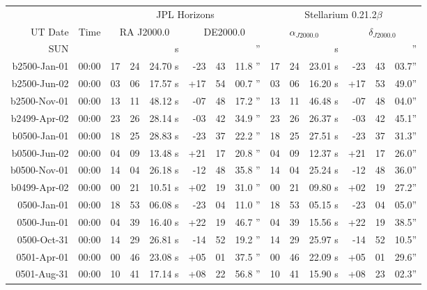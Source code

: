 \begin{longtable}{r@{\,}r|r@{h}r@{m}r<{s}|r@{°}r@{'}r<{''}||r@{h}r@{m}r<{s}|r@{°}r@{'}r<{''}}

\multicolumn{2}{c}{}&\multicolumn{6}{c||}{JPL Horizons} & \multicolumn{6}{c}{Stellarium 0.21.2$\beta$}\\ 
UT Date   & Time   & \multicolumn{3}{c}{RA J2000.0} & \multicolumn{3}{c||}{DE2000.0} & \multicolumn{3}{c}{$\alpha_{J2000.0}$} & \multicolumn{3}{c}{$\delta_{J2000.0}$} \\
\endhead
  
SUN\\
b2500-Jan-01 & 00:00  &   17 & 24 & 24.70 & -23 & 43 & 11.8 & 17&24&23.01 & -23&43&03.7\\ %
b2500-Jun-02 & 00:00  &   03 & 06 & 17.57 & +17 & 54 & 00.7 & 03&06&16.20 & +17&53&49.0\\ %
b2500-Nov-01 & 00:00  &   13 & 11 & 48.12 & -07 & 48 & 17.2 & 13&11&46.48 & -07&48&04.0\\ %
b2499-Apr-02 & 00:00  &   23 & 26 & 28.14 & -03 & 42 & 34.9 & 23&26&26.37 & -03&42&45.1\\ %
b0500-Jan-01 & 00:00  &   18 & 25 & 28.83 & -23 & 37 & 22.2 & 18&25&27.51 & -23&37&31.3\\ %
b0500-Jun-02 & 00:00  &   04 & 09 & 13.48 & +21 & 17 & 20.8 & 04&09&12.37 & +21&17&26.0\\ %
b0500-Nov-01 & 00:00  &   14 & 04 & 26.18 & -12 & 48 & 35.8 & 14&04&25.24 & -12&48&36.0\\ %
b0499-Apr-02 & 00:00  &   00 & 21 & 10.51 & +02 & 19 & 31.0 & 00&21&09.80 & +02&19&27.2\\ %
 0500-Jan-01 & 00:00  &   18 & 53 & 06.08 & -23 & 04 & 11.0 & 18&53&05.15 & -23&04&05.0\\ %
 0500-Jun-01 & 00:00  &   04 & 39 & 16.40 & +22 & 19 & 46.7 & 04&39&15.56 & +22&19&38.5\\ %
 0500-Oct-31 & 00:00  &   14 & 29 & 26.81 & -14 & 52 & 19.2 & 14&29&25.97 & -14&52&10.5\\ %
 0501-Apr-01 & 00:00  &   00 & 46 & 23.08 & +05 & 01 & 37.5 & 00&46&22.09 & +05&01&29.6\\ %
 0501-Aug-31 & 00:00  &   10 & 41 & 17.14 & +08 & 22 & 56.8 & 10&41&15.90 & +08&23&02.3\\ %

\end{longtable}
